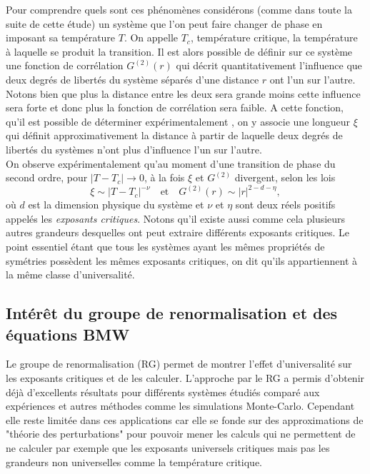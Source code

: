 \documentclass[10pt]{article}
\begin{document}
\begin{multicols}{2}
Pour comprendre quels sont ces phénomènes considérons (comme dans toute la suite de cette étude) un système que l'on peut faire changer de phase en imposant sa température $T$. On appelle $T_c$, température critique, la température à laquelle se produit la transition. Il est alors possible de définir sur ce système une fonction de corrélation $G^{(2)}(r)$ qui décrit quantitativement l'influence que deux degrés de libertés du système séparés d'une distance $r$ ont l'un sur l'autre. Notons bien que plus la distance entre les deux sera grande moins cette influence sera forte et donc plus la fonction de corrélation sera faible. A cette fonction, qu'il est possible de déterminer expérimentalement \cite{Bellac2012}, on y associe une longueur $\xi$ qui définit approximativement la distance à partir de laquelle deux degrés de libertés du systèmes n'ont plus d'influence l'un sur l'autre.\\

On observe expérimentalement qu'au moment d'une transition de phase du second ordre, pour $|T-T_c| \rightarrow 0$, à la fois $\xi$ et $G^{(2)}$ divergent, selon les lois 
\begin{equation}
	\xi \sim |T-T_c|^{-\nu} 	\quad \text{et} \quad G^{(2)}(r) \sim |r|^{2-d-\eta},
\end{equation}
où $d$ est la dimension physique du système et $\nu$ et $\eta$ sont deux réels positifs appelés les \emph{exposants critiques}. Notons qu'il existe aussi comme cela plusieurs autres grandeurs desquelles ont peut extraire différents exposants critiques. Le point essentiel étant que tous les systèmes ayant les mêmes propriétés de symétries possèdent les mêmes exposants critiques, on dit qu'ils appartiennent à la même classe d'universalité.\\


\subsection{Intérêt du groupe de renormalisation et des équations BMW}

Le groupe de renormalisation (RG) permet de montrer l'effet d'universalité sur les exposants critiques et de les calculer. L'approche par le RG a permis d'obtenir déjà d'excellents résultats \cite{kadanoff1967scaling, wilson1971renormalization2} pour différents systèmes étudiés comparé aux expériences et autres méthodes comme les simulations Monte-Carlo. Cependant elle reste limitée dans ces applications car elle se fonde sur des approximations de "théorie des perturbations" pour pouvoir mener les calculs qui ne permettent de ne calculer par exemple que les exposants universels critiques mais pas les grandeurs non universelles comme la température critique.\\


\end{multicols}
\end{document}
